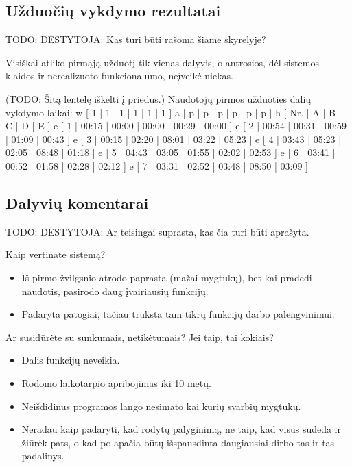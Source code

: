 \subsection{Užduočių vykdymo rezultatai}

TODO: DĖSTYTOJA: Kas turi būti rašoma šiame skyrelyje?

Visiškai atliko pirmąją užduotį tik vienas dalyvis, o antrosios, dėl
sistemos klaidos ir nerealizuoto funkcionalumo, neįveikė niekas.

(TODO: Šitą lentelę iškelti į priedus.)
Naudotojų pirmos užduoties dalių vykdymo laikai:
\xtable
{
  w [ 1 | 1 | 1 | 1 | 1 | 1 ]
  a [ p | p | p | p | p | p ]
  h [ Nr. | A | B | C | D | E ]
  e [ 1 | 00:15 | 00:00 | 00:00 | 00:29 | 00:00 ]
  e [ 2 | 00:54 | 00:31 | 00:59 | 01:09 | 00:43 ]
  e [ 3 | 00:15 | 02:20 | 08:01 | 03:22 | 05:23 ]
  e [ 4 | 03:43 | 05:23 | 02:05 | 08:48 | 01:18 ]
  e [ 5 | 04:43 | 03:05 | 01:55 | 02:02 | 02:53 ]
  e [ 6 | 03:41 | 00:52 | 01:58 | 02:28 | 02:12 ]
  e [ 7 | 03:31 | 02:52 | 03:48 | 08:50 | 03:09 ]
}

\subsection{Dalyvių komentarai}

TODO: DĖSTYTOJA: Ar teisingai suprasta, kas čia turi būti aprašyta.

Kaip vertinate sistemą?
\begin{itemize}
  \item Iš pirmo žvilgsnio atrodo paprasta (mažai mygtukų), bet
    kai pradedi naudotis, pasirodo daug įvairiausių funkcijų.
  \item Padaryta patogiai, tačiau trūksta tam tikrų funkcijų darbo
    palengvinimui.
\end{itemize}

Ar susidūrėte su sunkumais, netikėtumais? Jei taip, tai kokiais?
\begin{itemize}
  \item Dalis funkcijų neveikia.
  \item Rodomo laikotarpio apribojimas iki 10 metų.
  \item Neišdidinus programos lango nesimato kai kurių svarbių mygtukų.
  \item Neradau kaip padaryti, kad rodytų palyginimą, ne taip, kad visus
    sudeda ir žiūrėk pats, o kad po apačia būtų išspausdinta daugiausiai
    dirbo tas ir tas padalinys.
\end{itemize}

